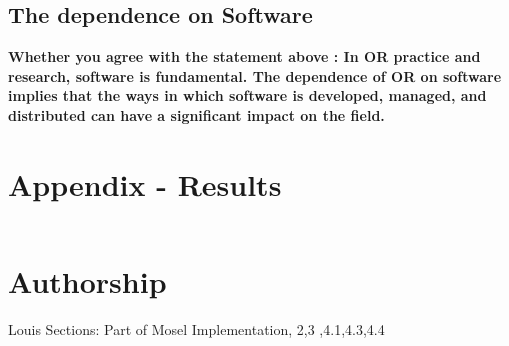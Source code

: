 \documentclass[a4paper,11pt]{article}
\begin{document}
\subsection{The dependence on Software}
\textbf{Whether you agree with the statement above : In OR practice and research, software is fundamental. The dependence
of OR on software implies that the ways in which software is developed, managed, and distributed can
have a significant impact on the field.}



























\clearpage
\section*{Appendix - Results}

\begin{lstlisting}

\end{lstlisting}

\section*{Authorship}

Louis Sections: Part of Mosel Implementation, 2,3 ,4.1,4.3,4.4



\clearpage


\end{document}
